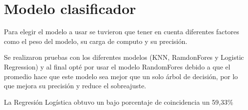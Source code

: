 \section{Modelo clasificador}
Para elegir el modelo a usar se tuvieron que tener en cuenta diferentes factores como el peso del modelo, su carga de computo y su precisión.

Se realizaron pruebas con los diferentes modelos (KNN, RamdonFores y Logistic Regression) y al final opté por usar el modelo RandomFores debido a que el promedio hace que este modelo sea mejor que un solo árbol de decisión, por lo que mejora su precisión y reduce el sobreajuste.

La Regresión Logística obtuvo un bajo porcentaje de coincidencia un 59,33\%




